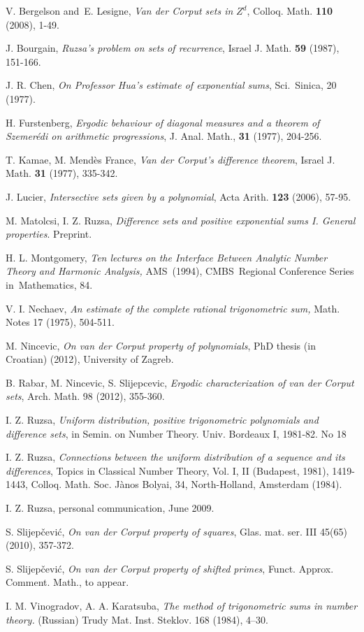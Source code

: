 \documentclass{amsart}
\numberwithin {equation}{section}
\begin{document}
\begin{thebibliography}{99}
 V. Bergelson and\ E. Lesigne, \emph{Van der Corput
sets in }$Z^{d}$, Colloq. Math. \textbf{110} (2008), 1-49.

 J. Bourgain, \emph{Ruzsa's problem on sets of
recurrence}, Israel J. Math. \textbf{59} (1987), 151-166.

 J. R. Chen, \emph{On Professor Hua's estimate of
exponential sums}, Sci.\ Sinica, 20 (1977).

 H. Furstenberg, \emph{Ergodic behaviour of diagonal
measures and a theorem of Szemer\'{e}di on arithmetic progressions}, J.
Anal. Math., \textbf{31} (1977), 204-256.

 T. Kamae, M. Mend\`{e}s France, \emph{Van der Corput's
difference theorem}, Israel J. Math. \textbf{31} (1977), 335-342.

 J. Lucier, \emph{Intersective sets given by a polynomial}, Acta Arith. \textbf{123} (2006), 57-95.

 M. Matolcsi, I. Z. Ruzsa, \emph{Difference sets and
positive exponential sums I. General properties}. Preprint.

 H. L. Montgomery, \emph{Ten lectures on the
Interface Between Analytic Number Theory and Harmonic Analysis, }AMS\
(1994), CMBS\ Regional Conference Series in\ Mathematics, 84.

 V. I. Nechaev, \emph{An estimate of the complete
rational trigonometric sum,} Math. Notes 17 (1975), 504-511.

 M. Nincevic, \emph{On van der Corput property of
polynomials}, PhD thesis (in Croatian) (2012), University of Zagreb.

 B. Rabar, M. Nincevic, S. Slijepcevic, \emph{Ergodic
characterization of van der Corput sets}, Arch. Math. 98 (2012), 355-360.

 I. Z. Ruzsa, \emph{Uniform distribution, positive
trigonometric polynomials and difference sets}, in Semin. on Number Theory.
Univ. Bordeaux I, 1981-82. No 18

 I. Z. Ruzsa, \emph{Connections between the uniform
distribution of a sequence and its differences}, Topics in Classical Number
Theory, Vol. I, II (Budapest, 1981), 1419-1443, Colloq. Math. Soc. J\`{a}nos
Bolyai, 34, North-Holland, Amsterdam (1984).

 I. Z. Ruzsa, personal communication, June 2009.

 S. Slijep\v{c}evi\'{c}, \emph{On van der Corput
property of squares}, Glas. mat. ser. III 45(65) (2010), 357-372.

 S. Slijep\v{c}evi\'{c}, \emph{On van der Corput
property of shifted primes}, Funct. Approx. Comment. Math., to appear.

 I. M. Vinogradov, A. A. Karatsuba, \emph{The method
of trigonometric sums in number theory.} (Russian) Trudy Mat. Inst. Steklov.
168 (1984), 4--30.
\end{thebibliography}
\end{document}
